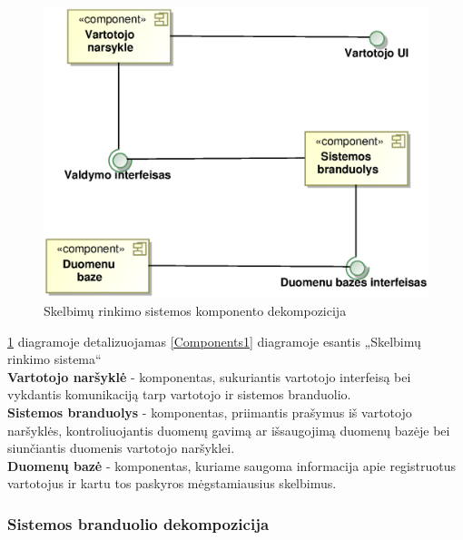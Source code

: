 \documentclass[12pt]{article}
\begin{document}
	\begin{figure}[h]
		\begin{center}
			\includegraphics[width=\textwidth]{Komponentai2.eps}
			\caption{Skelbimų rinkimo sistemos komponento dekompozicija\label{Components2}}
		\end{center}
	\end{figure}
	
	\ref{Components2} diagramoje detalizuojamas \ref{Components1} diagramoje esantis „Skelbimų rinkimo sistema“\\

	\textbf{Vartotojo naršyklė} - komponentas, sukuriantis vartotojo interfeisą bei vykdantis komunikaciją tarp vartotojo ir sistemos branduolio.\\

	
	\textbf{Sistemos branduolys} - komponentas, priimantis prašymus iš vartotojo naršyklės, kontroliuojantis duomenų gavimą ar išsaugojimą duomenų bazėje bei siunčiantis duomenis vartotojo naršyklei.\\

	
	\textbf{Duomenų bazė} - komponentas, kuriame saugoma informacija apie registruotus vartotojus ir kartu tos paskyros mėgstamiausius skelbimus.\\
	\pagebreak

	\subsubsection{Sistemos branduolio dekompozicija}
	
\end{document}
